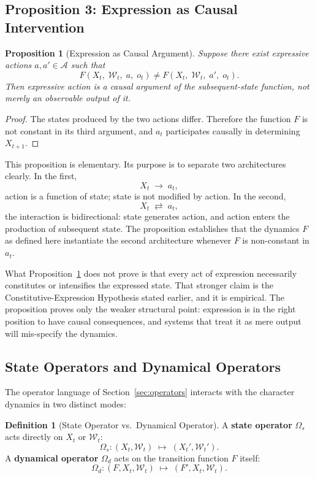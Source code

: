 \documentclass[11pt,a4paper]{article}
\theoremstyle{plain}
\newtheorem{proposition}[theorem]{Proposition}
\theoremstyle{definition}
\newtheorem{definition}[theorem]{Definition}
\theoremstyle{remark}
\begin{document}
\subsection{Proposition 3: Expression as Causal Intervention}

\begin{proposition}[Expression as Causal Argument]
\label{prop:causal}
Suppose there exist expressive actions $a, a' \in \mathcal{A}$ such that
\[
F(X_t,\; \mathcal{W}_t,\; a,\; o_t) \neq F(X_t,\; \mathcal{W}_t,\; a',\; o_t).
\]
Then expressive action is a causal argument of the subsequent-state function, not merely an observable output of it.
\end{proposition}

\begin{proof}
The states produced by the two actions differ. Therefore the function $F$ is not constant in its third argument, and $a_t$ participates causally in determining $X_{t+1}$.
\end{proof}

This proposition is elementary. Its purpose is to separate two architectures clearly. In the first,
\[
X_t \;\to\; a_t,
\]
action is a function of state; state is not modified by action. In the second,
\[
X_t \;\rightleftarrows\; a_t,
\]
the interaction is bidirectional: state generates action, and action enters the production of subsequent state. The proposition establishes that the dynamics $F$ as defined here instantiate the second architecture whenever $F$ is non-constant in $a_t$.

What Proposition~\ref{prop:causal} does not prove is that every act of expression necessarily constitutes or intensifies the expressed state. That stronger claim is the Constitutive-Expression Hypothesis stated earlier, and it is empirical. The proposition proves only the weaker structural point: expression is in the right position to have causal consequences, and systems that treat it as mere output will mis-specify the dynamics.

\subsection{State Operators and Dynamical Operators}

The operator language of Section~\ref{sec:operators} interacts with the character dynamics in two distinct modes:

\begin{definition}[State Operator vs.\ Dynamical Operator]
A \textbf{state operator} $\Omega_s$ acts directly on $X_t$ or $\mathcal{W}_t$:
\[
\Omega_s : (X_t, \mathcal{W}_t) \;\mapsto\; (X_t', \mathcal{W}_t').
\]
A \textbf{dynamical operator} $\Omega_d$ acts on the transition function $F$ itself:
\[
\Omega_d : (F, X_t, \mathcal{W}_t) \;\mapsto\; (F', X_t, \mathcal{W}_t).
\]
\end{definition}
\end{document}
